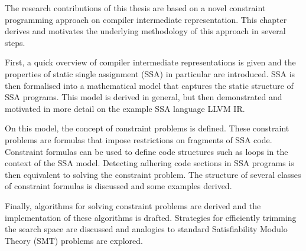 
    \vfill
    The research contributions of this thesis are based on a novel constraint
    programming approach on compiler intermediate representation.
    This chapter derives and motivates the underlying methodology of this
    approach in several steps.

    First, a quick overview of compiler intermediate representations is given
    and the properties of static single assignment (SSA) in particular are
    introduced.
    SSA is then formalised into a mathematical model that captures the static
    structure of SSA programs.
    This model is derived in general, but then demonstrated and motivated in
    more detail on the example SSA language LLVM IR.

    On this model, the concept of constraint problems is defined.
    These constraint problems are formulas that impose restrictions on fragments
    of SSA code.
    Constraint formulas can be used to define code structures such as loops in
    the context of the SSA model.
    Detecting adhering code sections in SSA programs is then equivalent to
    solving the constraint problem.
    The structure of several classes of constraint formulas is discussed and
    some examples derived.

    Finally, algorithms for solving constraint problems are derived and the
    implementation of these algorithms is drafted.
    Strategies for efficiently trimming the search space are discussed and
    analogies to standard Satisfiability Modulo Theory (SMT) problems are
    explored.
    \vfill



